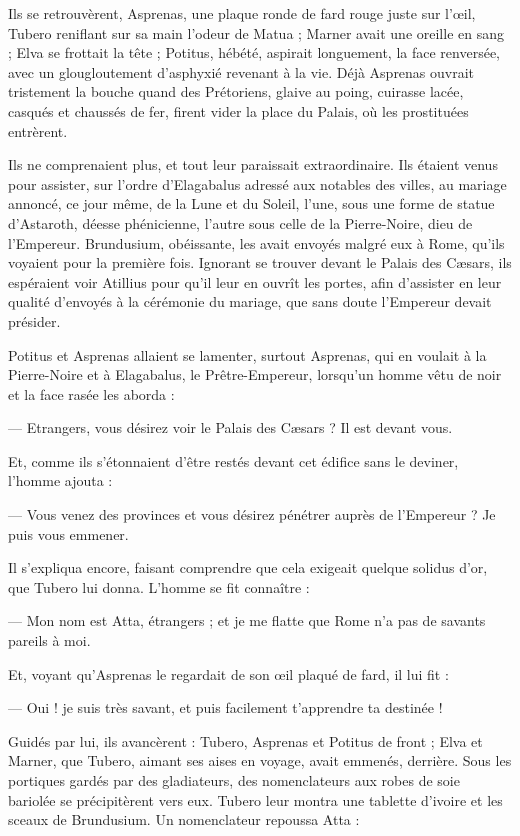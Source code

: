 \documentclass[a4paper, 11pt, oneside, polutonikogreek, french]{article}
\begin{document}
Ils se retrouvèrent, Asprenas, une plaque ronde de fard rouge juste sur l'œil, Tubero reniflant sur sa main l'odeur de Matua ; Marner avait une oreille en sang ; Elva se frottait la tête ; Potitus, hébété, aspirait longuement, la face renversée, avec un glougloutement d'asphyxié revenant à la vie. Déjà Asprenas ouvrait tristement la bouche quand des Prétoriens, glaive au poing, cuirasse lacée, casqués et chaussés de fer, firent vider la place du Palais, où les prostituées entrèrent.

Ils ne comprenaient plus, et tout leur paraissait extraordinaire. Ils étaient venus pour assister, sur l'ordre d'Elagabalus adressé aux notables des villes, au mariage annoncé, ce jour même, de la Lune et du Soleil, l'une, sous une forme de statue d'Astaroth, déesse phénicienne, l'autre sous celle de la Pierre-Noire, dieu de l'Empereur. Brundusium, obéissante, les avait envoyés malgré eux à Rome, qu'ils voyaient pour la première fois. Ignorant se trouver devant le Palais des Cæsars, ils espéraient voir Atillius pour qu'il leur en ouvrît les portes, afin d'assister en leur qualité d'envoyés à la cérémonie du mariage, que sans doute l'Empereur devait présider.

Potitus et Asprenas allaient se lamenter, surtout Asprenas, qui en voulait à la Pierre-Noire et à Elagabalus, le Prêtre-Empereur, lorsqu'un homme vêtu de noir et la face rasée les aborda :

--- Etrangers, vous désirez voir le Palais des Cæsars ? Il est devant vous.

Et, comme ils s'étonnaient d'être restés devant cet édifice sans le deviner, l'homme ajouta :

--- Vous venez des provinces et vous désirez pénétrer auprès de l’Empereur ? Je puis vous emmener.

Il s'expliqua encore, faisant comprendre que cela exigeait quelque solidus d'or, que Tubero lui donna. L'homme se fit connaître :

--- Mon nom est Atta, étrangers ; et je me flatte que Rome n'a pas de savants pareils à moi.

Et, voyant qu'Asprenas le regardait de son œil plaqué de fard, il lui fit :

--- Oui ! je suis très savant, et puis facilement t'apprendre ta destinée !

Guidés par lui, ils avancèrent : Tubero, Asprenas et Potitus de front ; Elva et Marner, que Tubero, aimant ses aises en voyage, avait emmenés, derrière. Sous les portiques gardés par des gladiateurs, des nomenclateurs aux robes de soie bariolée se précipitèrent vers eux. Tubero leur montra une tablette d'ivoire et les sceaux de Brundusium. Un nomenclateur repoussa Atta :
\end{document}
